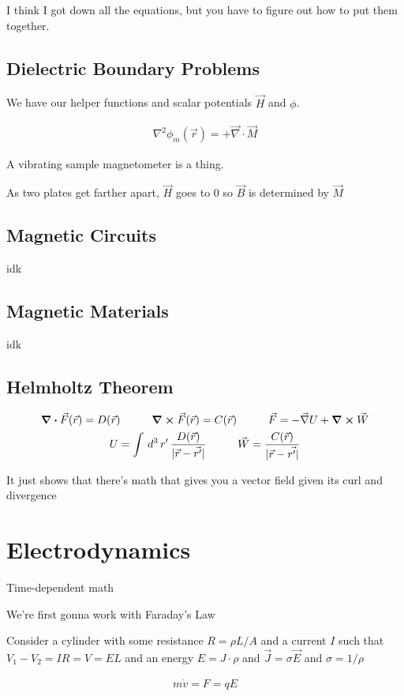 \documentclass[fleqn]{report}
\newcommand{\hp}{\hspace{1cm}}
\newcommand{\equations} [1] {
\begin{gather*}
#1
\end{gather*}
}
\begin{document}
I think I got down all the equations, but you have to figure out 
how to put them together. 

\section{Dielectric Boundary Problems}
We have our helper functions and scalar potentials $\vec H$ and $\phi$. 

\equations{
    \nabla^2 \phi_m(\vec r)
    =
    + \vec \nabla \cdot \vec M 
}

A vibrating sample magnetometer is a thing. 

As two plates get farther apart, $\vec H$ goes to $0$ so $\vec B$ is 
determined by $\vec M$ 

\section{Magnetic Circuits}
idk

\section{Magnetic Materials}
idk

\section{Helmholtz Theorem}
\equations{
    \div \vec F(\vec r) = D(\vec r)
    \hp
    \curl \vec F(\vec r) = C(\vec r)
    \hp 
    \vec F 
    =
    - \vec \nabla U 
    +
    \curl \vec W 
    \\
    U 
    =
    \int \, d^3 \, r' \, 
    \frac{D(\vec r )}{|\vec r - \vec{r'}|}
    \hp 
    \vec W 
    =
    \frac{C(\vec r )}{|\vec r - \vec{r'|}}
}

It just shows that there's math that gives you a vector field given 
its curl and divergence 

\chapter{Electrodynamics}
Time-dependent math 

We're first gonna work with Faraday's Law 

Consider a cylinder with some resistance $R = \rho L / A$ and a current $I$ 
such that $V_1 - V_2 = IR = V = EL$ and an energy $E = J \cdot \rho$ and 
$\vec J = \sigma \vec E$ and $\sigma = 1/\rho$ 

\equations{
    m \dot{v} = F = q E 
}
\end{document}
